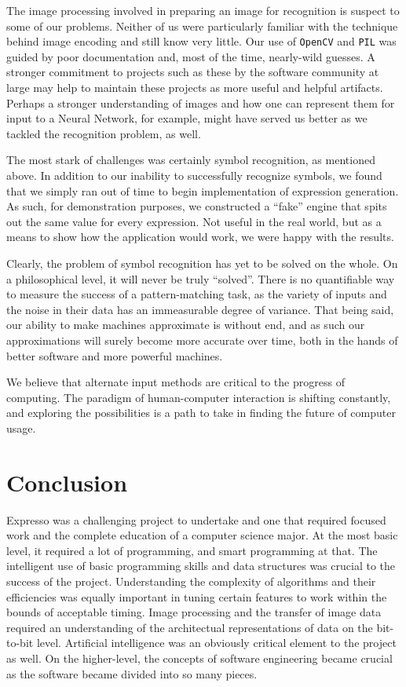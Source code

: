 \documentclass{acm_proc_article-sp}
\begin{document}
The image processing involved in preparing an image for recognition is suspect to some of our problems. Neither of us were particularly familiar with the technique behind image encoding and still know very little. Our use of \texttt{OpenCV} and \texttt{PIL} was guided by poor documentation and, most of the time, nearly-wild guesses. A stronger commitment to projects such as these by the software community at large may help to maintain these projects as more useful and helpful artifacts. Perhaps a stronger understanding of images and how one can represent them for input to a Neural Network, for example, might have served us better as we tackled the recognition problem, as well.

The most stark of challenges was certainly symbol recognition, as mentioned above. In addition to our inability to successfully recognize symbols, we found that we simply ran out of time to begin implementation of expression generation. As such, for demonstration purposes, we constructed a ``fake'' engine that spits out the same value for every expression. Not useful in the real world, but as a means to show how the application would work, we were happy with the results.

Clearly, the problem of symbol recognition has yet to be solved on the whole. On a philosophical level, it will never be truly ``solved''. There is no quantifiable way to measure the success of a pattern-matching task, as the variety of inputs and the noise in their data has an immeasurable degree of variance. That being said, our ability to make machines approximate is without end, and as such our approximations will surely become more accurate over time, both in the hands of better software and more powerful machines.

We believe that alternate input methods are critical to the progress of computing. The paradigm of human-computer interaction is shifting constantly, and exploring the possibilities is a path to take in finding the future of computer usage.

\section{Conclusion}
Expresso was a challenging project to undertake and one that required focused work and the complete education of a computer science major. At the most basic level, it required a lot of programming, and smart programming at that. The intelligent use of basic programming skills and data structures was crucial to the success of the project. Understanding the complexity of algorithms and their efficiencies was equally important in tuning certain features to work within the bounds of acceptable timing. Image processing and the transfer of image data required an understanding of the architectual representations of data on the bit-to-bit level. Artificial intelligence was an obviously critical element to the project as well. On the higher-level, the concepts of software engineering became crucial as the software became divided into so many pieces. 
\end{document}

